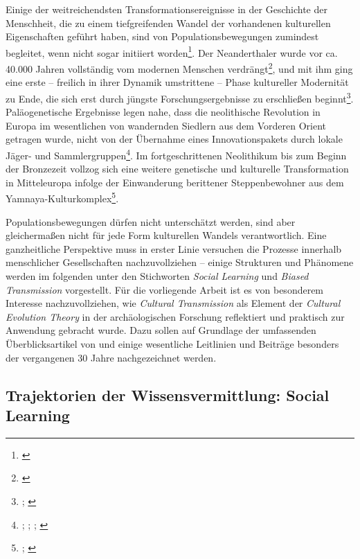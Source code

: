 \documentclass[openany,twoside,twocolumn]{book}
\let\rmarkdownfootnote\footnote%
\def\footnote{\protect\rmarkdownfootnote}
\begin{document}
Einige der weitreichendsten Transformationsereignisse in der Geschichte der Menschheit, die zu einem tiefgreifenden Wandel der vorhandenen kulturellen Eigenschaften geführt haben, sind von Populationsbewegungen zumindest begleitet, wenn nicht sogar initiiert worden\footnote{\textcite{boyd_voting_2009}}. Der Neanderthaler wurde vor ca. 40.000 Jahren vollständig vom modernen Menschen verdrängt\footnote{\textcite{skoglund_origins_2012}}, und mit ihm ging eine erste -- freilich in ihrer Dynamik umstrittene -- Phase kultureller Modernität zu Ende, die sich erst durch jüngste Forschungsergebnisse zu erschließen beginnt\footnote{\textcite{hoffmann_symbolic_2018}; \textcite{tuniz_did_2012}}. Paläogenetische Ergebnisse legen nahe, dass die neolithische Revolution in Europa im wesentlichen von wandernden Siedlern aus dem Vorderen Orient getragen wurde, nicht von der Übernahme eines Innovationspakets durch lokale Jäger- und Sammlergruppen\footnote{\textcite{aoki_travelling_1996}; \textcite{bar-yosef_nature_1998}; \textcite{patterson_modelling_2010}; \textcite{skoglund_origins_2012}}. Im fortgeschrittenen Neolithikum bis zum Beginn der Bronzezeit vollzog sich eine weitere genetische und kulturelle Transformation in Mitteleuropa infolge der Einwanderung berittener Steppenbewohner aus dem Yamnaya-Kulturkomplex\footnote{\textcite{allentoft_population_2015}; \textcite{goldberg_ancient_2017}}.

Populationsbewegungen dürfen nicht unterschätzt werden, sind aber gleichermaßen nicht für jede Form kulturellen Wandels verantwortlich. Eine ganzheitliche Perspektive muss in erster Linie versuchen die Prozesse innerhalb menschlicher Gesellschaften nachzuvollziehen -- einige Strukturen und Phänomene werden im folgenden unter den Stichworten \emph{Social Learning} und \emph{Biased Transmission} vorgestellt. Für die vorliegende Arbeit ist es von besonderem Interesse nachzuvollziehen, wie \emph{Cultural Transmission} als Element der \emph{Cultural Evolution Theory} in der archäologischen Forschung reflektiert und praktisch zur Anwendung gebracht wurde. Dazu sollen auf Grundlage der umfassenden Überblicksartikel von \textcite{eerkens_cultural_2007} und \textcite{garvey_current_2018-1} einige wesentliche Leitlinien und Beiträge besonders der vergangenen 30 Jahre nachgezeichnet werden.

\hypertarget{social-learning}{%
\subsection{Trajektorien der Wissensvermittlung: Social Learning}\label{social-learning}}
\end{document}
